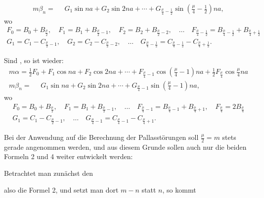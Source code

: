 \begin{landscape}
\[\begin{array}{l}
m\beta_n = \phantom{{}={}} G_1\sin na + G_2\sin 2na + \cdots + G_{\frac{\mu}{4}-\frac{1}{2}}\sin\left(\frac{\mu}{4}-\frac{1}{2}\right)na,
\end{array}
\]
wo
\[
\begin{gathered}
F_0 = B_0 + B_{\frac{\mu}{2}}, \quad F_1 = B_1 + B_{\frac{\mu}{2}-1}, \quad F_2 = B_2 + B_{\frac{\mu}{2}-2}, \quad \ldots \quad F_{\frac{\mu}{4}-\frac{1}{2}} = B_{\frac{\mu}{4}-\frac{1}{2}} + B_{\frac{\mu}{4}+\frac{1}{2}}\\[4pt]
G_1 = C_1 - C_{\frac{\mu}{2}-1}, \quad G_2 = C_2 - C_{\frac{\mu}{2}-2}, \quad \ldots \quad G_{\frac{\mu}{4}-\frac{1}{2}} = C_{\frac{\mu}{4}-\frac{1}{2}} - C_{\frac{\mu}{4}+\frac{1}{2}}.
\end{gathered}
\]
\par\noindent\hspace*{\parindent}Sind , so ist wieder:
\[
\tag*{4)}
\begin{array}{l}
m\alpha = \tfrac{1}{2}F_0 + F_1\cos na + F_2\cos 2na + \cdots + F_{\frac{\mu}{4}-1}\cos\left(\frac{\mu}{4}-1\right)na + \tfrac{1}{2}F_{\frac{\mu}{4}}\cos\frac{\mu}{4}na \\[4pt]
m\beta_n = \phantom{{}={}} G_1\sin na + G_2\sin 2na + \cdots + G_{\frac{\mu}{4}-1}\sin\left(\frac{\mu}{4}-1\right)na,
\end{array}
\]
wo
\[
\begin{gathered}
F_0 = B_0 + B_{\frac{\mu}{2}}, \quad F_1 = B_1 + B_{\frac{\mu}{2}-1}, \quad \ldots \quad F_{\frac{\mu}{4}-1} = B_{\frac{\mu}{4}-1} + B_{\frac{\mu}{4}+1}, \quad F_{\frac{\mu}{4}} = 2B_{\frac{\mu}{4}}\\[4pt]
G_1 = C_1 - C_{\frac{\mu}{2}-1}, \quad \ldots \quad G_{\frac{\mu}{4}-1} = C_{\frac{\mu}{4}-1} - C_{\frac{\mu}{4}+1}.
\end{gathered}
\]
\par\noindent\hspace*{\parindent}Bei der Anwendung auf die Berechnung der Pallasst\"orungen soll \(\frac{\mu}{2}=m\) stets gerade angenommen werden, und aus diesem Grunde sollen auch nur die beiden Formeln 2 und 4 weiter entwickelt werden:
\par\noindent\hspace*{\parindent}Betrachtet man zun\"achst den
\par\nobreak\smallskip\noindent\hfill{}\hfill\mbox{}\par\nobreak\smallskip\noindent
also die Formel 2, und setzt man dort \(m-n\) statt \(n\), so kommt

\end{landscape}
